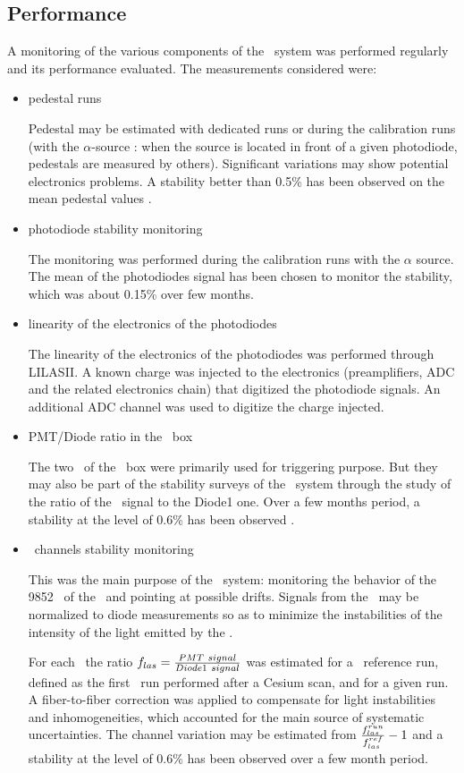 \subsection{Performance}
A monitoring of the various components of the \lasi~system was performed regularly and its performance evaluated.  The measurements considered were:
\begin{itemize}
\item{pedestal runs} 
	
	Pedestal may be estimated with dedicated runs or during the calibration runs (with the $\alpha$-source : when the source is located in front of a given photodiode, pedestals are measured by others). Significant variations may show potential electronics problems. A stability better than 0.5\% has been observed on the mean pedestal values \cite{ref:laserb}.
\item{photodiode stability monitoring}
	
	The monitoring was performed during the calibration runs with the $\alpha$ source. The mean of the photodiodes signal has been chosen to monitor the stability, which was about 0.15\% over few months.
	
\item{linearity of the electronics of the photodiodes}
	
	The linearity of the electronics of the photodiodes was performed through {\sc LILASII}. A known charge was injected to the electronics (preamplifiers, ADC and the related electronics chain) that digitized the photodiode signals. An additional ADC channel was used to digitize the charge injected. 
\item{PMT/Diode ratio in the \las~box}
	
	The two \pmts~of the \las~box were primarily used for triggering purpose. But they may also be part of the stability surveys of the \las~system through the study of the ratio of the \pmts~signal to the Diode1 one. Over a few months period, a stability at the level of 0.6\% has been observed \cite{ref:laserb}.
	
\item{\tilecal~channels stability monitoring}
	
	This was the main purpose of the \las~system: monitoring the behavior of the 9852 \pmts~of the \tilecal~and pointing at possible drifts. Signals from the \pmts~may be normalized to diode measurements so as to minimize the instabilities of the intensity of the light emitted by the \las.  \par
	For each \pmt~the ratio $f_{las}={{PMT~signal}\over{Diode1~signal}}$ was estimated for a \las~reference run, defined as the first \las~run performed after a Cesium scan, and for a given run. A fiber-to-fiber correction was applied to compensate for light instabilities and inhomogeneities, which accounted for the main source of systematic uncertainties. The channel variation may be estimated from ${{f_{las}^{run}}\over{f_{las}^{ref}}}-1$ and a stability at the level of 0.6\% has been observed over a few month period.
	
	
\end{itemize}


